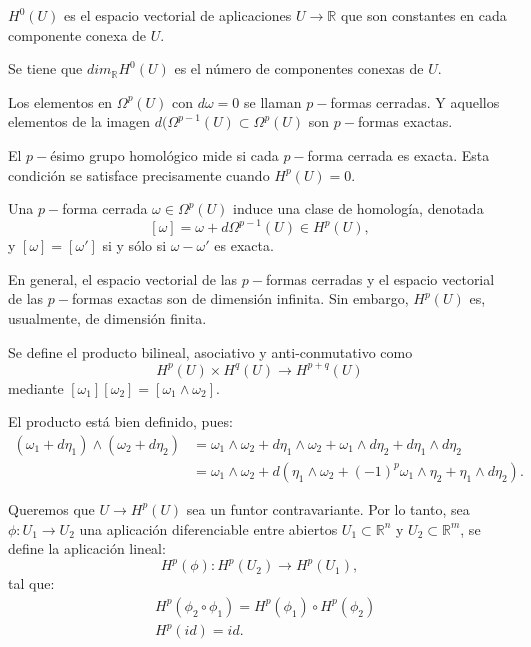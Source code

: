 \begin{Lem}
$H^0(U)$ es el espacio vectorial de aplicaciones $U\rightarrow \mathbb{R}$ que son constantes en cada componente conexa de $U$. 
\end{Lem}

Se tiene que $dim_{\mathbb{R}} H^0(U)$ es el número de componentes conexas de $U$.

\begin{Def}
Los elementos en $\Omega^p(U)$ con $d\omega =0$ se llaman $p-$formas cerradas. Y aquellos elementos de la imagen $d(\Omega^{p-1}(U)\subset \Omega^p(U)$ son $p-$formas exactas. 
\end{Def}

\begin{nota}
El $p-$ésimo grupo homológico mide si cada $p-$forma cerrada es exacta. Esta condición se satisface precisamente cuando $H^p(U)=0$. 
\end{nota}

\begin{Def}
  Una $p-$forma cerrada $\omega\in \Omega^p(U)$ induce una clase de homología, denotada
  $$[\omega]=\omega+d\Omega^{p-1}(U)\in H^p(U) ,$$
  y $[\omega]=[\omega ']$ si y sólo si $\omega-\omega'$ es exacta.
\end{Def}

\begin{nota}
  En general, el espacio vectorial de las $p-$formas cerradas y el espacio vectorial de las $p-$formas exactas son de dimensión infinita. Sin embargo, $H^p(U)$ es, usualmente, de dimensión finita.
\end{nota}


\begin{Def}
  Se define el producto bilineal, asociativo y anti-conmutativo como
  $$H^p(U)\times H^q(U)\rightarrow H^{p+q}(U)$$
  mediante $[\omega_1][\omega_2]=[\omega_1\wedge \omega_2]$.
\end{Def}
El producto está bien definido, pues:
\begin{equation}
  \begin{split}
    (\omega_1+d\eta_1)\wedge (\omega_2+d\eta_2) &= \omega_1\wedge \omega_2 + d \eta_1\wedge \omega_2+\omega_1\wedge d \eta_2+d\eta_1\wedge d\eta_2 \\
    &= \omega_1 \wedge \omega_2+d(\eta_1\wedge \omega_2+(-1)^p\omega_1\wedge \eta_2+\eta_1\wedge d\eta_2).
  \end{split}
\end{equation}

Queremos que $U\rightarrow H^p(U)$ sea un funtor contravariante. Por lo tanto, sea $\phi:U_1\rightarrow U_2$ una aplicación diferenciable entre abiertos $U_1\subset  \mathbb{R}^n$ y $U_2\subset \mathbb{R}^m$, se define la aplicación lineal:
$$H^p(\phi):H^p(U_2)\rightarrow H^p(U_1), $$
tal que:
\begin{equation}
  \begin{split}
    &H^p(\phi_2 \circ \phi_1)=H^p(\phi_1)\circ H^p(\phi_2) \\
    &H^p(id)=id.
  \end{split}
\end{equation}

